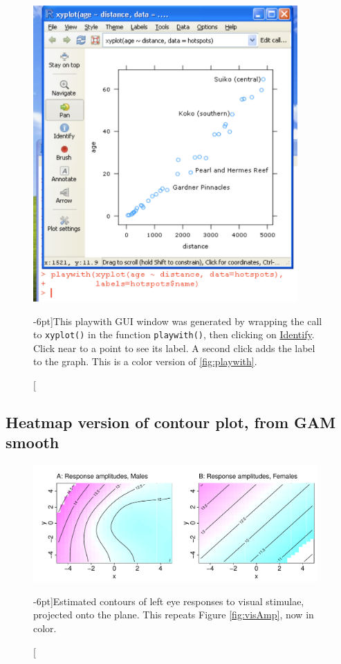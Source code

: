 \documentclass{tufte-book}\usepackage[]{graphicx}\usepackage[]{color}
\begin{document}
\begin{figure}[h]
\centerline{\includegraphics[width=0.9\textwidth]{colorArt/playwith}}%
\caption[][-6pt]{This playwith GUI window was generated by wrapping the call
  to \texttt{xyplot()} in the function \texttt{playwith()}, then
  clicking on \underline{Identify}. Click near to a point to see its
  label. A second click adds the label to the graph.  This is a color version
of \ref{fig:playwith}.\label{col:playwith}}
\end{figure}

\newpage
\subsection*{Heatmap version of contour plot, from GAM smooth}

\begin{fullwidth}
\begin{figure}
\begin{Schunk}
\centerline{\includegraphics[width=0.97\textwidth]{colorArt/18i-further-plotVIS} }
\end{Schunk}
\caption[][-6pt]{Estimated contours of left eye responses to visual stimulae,
projected onto the plane.  This repeats Figure \ref{fig:visAmp},
now in color.\label{col:visAmp}}
\vspace*{12pt}
\end{figure}
\end{fullwidth}
\end{document}
